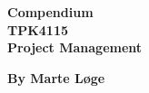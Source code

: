\begin{titlepage}
\begin{center}

{\Huge \bf Compendium} \\[1.0cm]
{\Huge \bf TPK4115} \\[1.0cm]
{\Large \bf Project Management} \\[1.0cm]
\vspace{1cm}

{\bf By Marte Løge}


\end{center}
\end{titlepage}